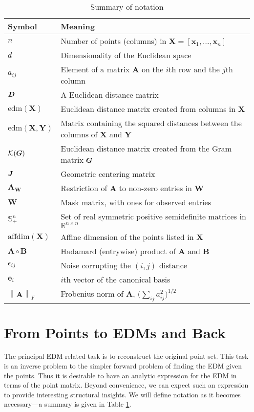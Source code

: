 \documentclass[10pt,double]{IEEEtran}
\providecommand{\R}{\ensuremath{\mathbb{R}}}
\renewcommand{\S}{\ensuremath{\mathbb{S}}}
\providecommand{\norm}[1]{\left\lVert#1\right\rVert}
\renewcommand{\vec}[1]{\ensuremath{\boldsymbol{#1}}}
\providecommand{\mat}[1]{\ensuremath{\boldsymbol{#1}}}
\providecommand{\mA}{\mat{A}} \providecommand{\mB}{\mat{B}}
\providecommand{\mW}{\mat{W}}
\providecommand{\mX}{\mat{X}}\providecommand{\mY}{\mat{Y}}
\providecommand{\ve}{\vec{e}} \providecommand{\vf}{\vec{f}}
\providecommand{\vx}{\vec{x}} \providecommand{\vy}{\vec{y}}
\newcommand{\EDM}{\ensuremath{\mathrm{edm}}}
\newcommand{\EDMgram}{\ensuremath{\mathcal{K}}}
\newcommand{\affdim}{\ensuremath{\mathrm{affdim}}}
\begin{document}
\begin{table}[h!]
  \centering
  \caption{Summary of notation}
  \begin{tabular}{@{}p{0.5in}p{2.7in}@{}}
  \toprule
  {\bf Symbol} & {\bf Meaning} \\
  \midrule
  $n$ &
  Number of points (columns) in $\mX = [\vx_1, \ldots, \vx_n]$\\
  $d$ &
  Dimensionality of the Euclidean space\\
  $a_{ij}$ &
  Element of a matrix $\mA$ on the $i$th row and the $j$th column\\
  $\mD$ &
  A Euclidean distance matrix \\
  $\EDM(\mX)$ &
  Euclidean distance matrix created from columns in $\mX$ \\ 
  $\EDM(\mX,\mY)$ &
  Matrix containing the squared distances between the columns of $\mX$ and $\mY$ \\
  $\EDMgram(\mG)$ &
  Euclidean distance matrix created from the Gram matrix $\mG$ \\
  $\mJ$ &
  Geometric centering matrix \\
  $\mA_{\mW}$ &
  Restriction of $\mA$ to non-zero entries in $\mW$ \\
  $\mW$ &
  Mask matrix, with ones for observed entries \\
  $\S_+^n$ &
  Set of real symmetric positive semidefinite matrices in $\R^{n \times n}$ \\
  $\affdim(\mX)$ &
  Affine dimension of the points listed in $\mX$ \\
  $\mA \circ \mB$ &
  Hadamard (entrywise) product of $\mA$ and $\mB$ \\
  $\epsilon_{ij}$ &
  Noise corrupting the $(i,j)$ distance\\
  $\ve_i$ &
  $i$th vector of the canonical basis\\
  $\norm{ \mA }_F$ &
  Frobenius norm of $\mA$, $\big(\sum_{ij} a_{ij}^2\big)^{1/2}$\\
  \bottomrule
  \end{tabular}
  \label{tab:notation-summary}
\end{table}


\section{From Points to EDMs and Back} \label{sec:from_points_to_edms_and_back}
  
The principal EDM-related task is to reconstruct the original point set. This
task is an inverse problem to the simpler forward problem of finding the EDM
given the points. Thus it is desirable to have an analytic expression for the
EDM in terms of the point matrix. Beyond convenience, we can expect such an
expression to provide interesting structural insights. We will define notation
as it becomes necessary---a summary is given in Table
\ref{tab:notation-summary}.
\end{document}
